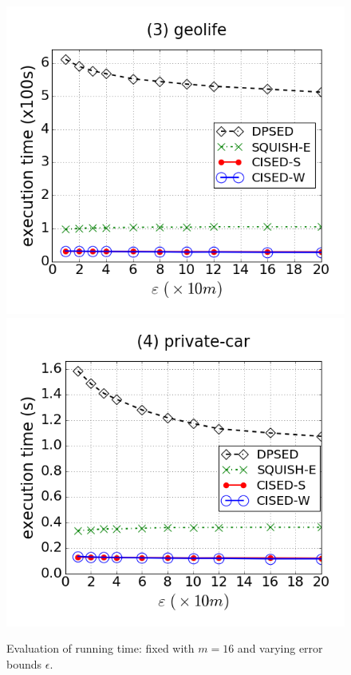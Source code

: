 \begin{figure}[tb!]
\includegraphics[scale = 0.250]{figures/Exp-time-epsilon-geolife.png}
\includegraphics[scale = 0.250]{figures/Exp-time-epsilon-private.png}
\vspace{-2ex}
\caption{\small Evaluation of running time: fixed with $m=16$ and varying error bounds $\epsilon$.}
\label{fig:time-epsilon}
\vspace{-2ex}
\end{figure}



